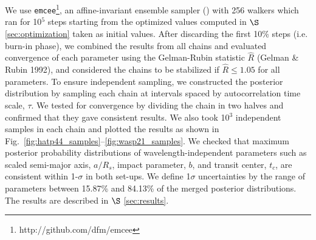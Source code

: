 We use \verb'emcee'\footnote{http://github.com/dfm/emcee}, an affine-invariant ensemble sampler (\cite{Foreman-Mackey2013}) with 256 walkers which ran for 10$^5$ steps starting from the optimized values computed in $\S$\ref{sec:optimization} taken as initial values. 
After discarding the first 10\% steps (i.e. burn-in phase),  
we combined the results from all chains and evaluated convergence of each parameter using the Gelman-Rubin statistic $\hat{R}$ (Gelman \& Rubin 1992), and considered the chains to be stabilized %
if $\hat{R} \leq 1.05$ for all parameters. To ensure independent sampling, we constructed the posterior distribution by sampling each chain at intervals spaced by autocorrelation time scale, $\tau$.  %
We tested for convergence by dividing the chain in two halves and confirmed that they gave consistent results. We also took 10$^3$ independent samples in each chain and plotted the results as shown in Fig.~\ref{fig:hatp44_samples}--\ref{fig:wasp21_samples}.
We checked that maximum posterior probability distributions of wavelength-independent parameters such as scaled semi-major axis, $a/R_s$, impact parameter, $b$, and transit center, $t_c$, 
are consistent within 1-$\sigma$ in both set-ups. %
We define 1$\sigma$ uncertainties by the range of parameters between 15.87\% and 84.13\% of the merged posterior distributions. The results are described in $\S$ \ref{sec:results}. 
